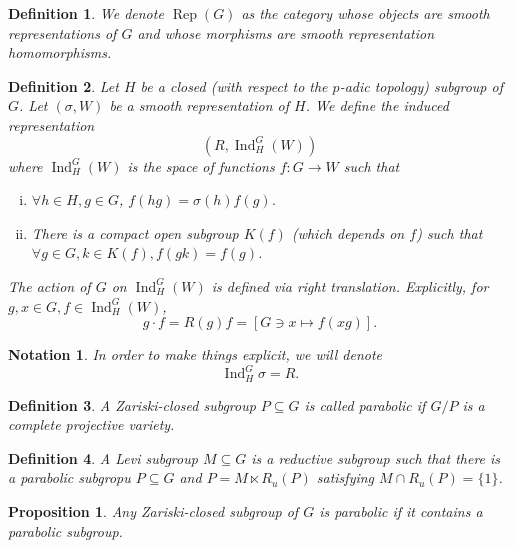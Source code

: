 \documentclass[8pt]{article}
\newtheorem{proposition}{Proposition}[section]
\newtheorem{definition}{Definition}[section]
\newtheorem{notation}{Notation}[section]
\DeclareMathOperator{\Ind}{Ind}
\DeclareMathOperator{\Rep}{Rep}
\begin{document}
\begin{definition}
We denote $\Rep(G)$ as the category whose objects are smooth representations of $G$ and whose morphisms are smooth representation homomorphisms.
\end{definition}

\begin{definition}
Let $H$ be a closed (with respect to the $p$-adic topology) subgroup of $G$. Let $(\sigma, W)$ be a smooth representation of $H$. We define the induced representation
\begin{equation*}
(R,\Ind_H^G(W))
\end{equation*}
where $\Ind_H^G(W)$ is the space of functions $f:G\to W$ such that 
\begin{enumerate}[i).]
\item $\forall h\in H, g\in G$, $f(hg) = \sigma(h)f(g)$. 
\item There is a compact open subgroup $K(f)$ (which depends on $f$) such that $\forall g\in G, k\in K(f), f(gk) = f(g)$. 
\end{enumerate}
The action of $G$ on $\Ind_H^G(W)$ is defined via right translation. Explicitly, for $g,x\in G, f\in\Ind_H^G(W)$, 
\begin{equation*}
g\cdot f = R(g)f = [G\ni x\mapsto f(xg)].
\end{equation*}
\end{definition}

\begin{notation}
In order to make things explicit, we will denote 
\begin{equation*}
\Ind_H^G\sigma = R.
\end{equation*}
\end{notation}

\begin{definition}
  A Zariski-closed subgroup $P\subseteq G$ is called parabolic if $G/P$ is a complete projective variety.
\end{definition}

\begin{definition}
  A Levi subgroup $M\subseteq G$ is a reductive subgroup such that there is a parabolic subgropu $P\subseteq G$ and $P=M\ltimes R_u(P)$ satisfying $M\cap R_u(P)=\{1\}$.
\end{definition}

\begin{proposition}
  Any Zariski-closed subgroup of $G$ is parabolic if it contains a parabolic subgroup.
\end{proposition}
\end{document}
